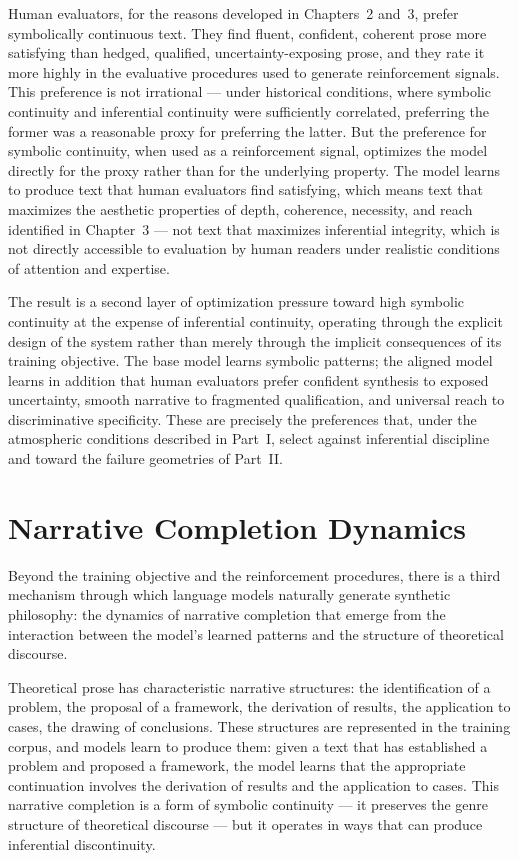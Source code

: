 \documentclass[12pt, openright, twoside]{book}
\begin{document}
Human evaluators, for the reasons developed in Chapters~2
and~3, prefer symbolically continuous text. They find
fluent, confident, coherent prose more satisfying than
hedged, qualified, uncertainty-exposing prose, and they
rate it more highly in the evaluative procedures used
to generate reinforcement signals. This preference is
not irrational --- under historical conditions, where
symbolic continuity and inferential continuity were
sufficiently correlated, preferring the former was a
reasonable proxy for preferring the latter. But the
preference for symbolic continuity, when used as a
reinforcement signal, optimizes the model directly for
the proxy rather than for the underlying property. The
model learns to produce text that human evaluators find
satisfying, which means text that maximizes the aesthetic
properties of depth, coherence, necessity, and reach
identified in Chapter~3 --- not text that maximizes
inferential integrity, which is not directly accessible
to evaluation by human readers under realistic conditions
of attention and expertise.

The result is a second layer of optimization pressure
toward high symbolic continuity at the expense of
inferential continuity, operating through the explicit
design of the system rather than merely through the
implicit consequences of its training objective. The
base model learns symbolic patterns; the aligned model
learns in addition that human evaluators prefer confident
synthesis to exposed uncertainty, smooth narrative to
fragmented qualification, and universal reach to
discriminative specificity. These are precisely the
preferences that, under the atmospheric conditions
described in Part~I, select against inferential
discipline and toward the failure geometries of Part~II.

\section{Narrative Completion Dynamics}

Beyond the training objective and the reinforcement
procedures, there is a third mechanism through which
language models naturally generate synthetic philosophy:
the dynamics of narrative completion that emerge from
the interaction between the model's learned patterns
and the structure of theoretical discourse.

Theoretical prose has characteristic narrative structures:
the identification of a problem, the proposal of a
framework, the derivation of results, the application
to cases, the drawing of conclusions. These structures
are represented in the training corpus, and models
learn to produce them: given a text that has established
a problem and proposed a framework, the model learns
that the appropriate continuation involves the derivation
of results and the application to cases. This narrative
completion is a form of symbolic continuity --- it
preserves the genre structure of theoretical discourse
--- but it operates in ways that can produce inferential
discontinuity.
\end{document}
